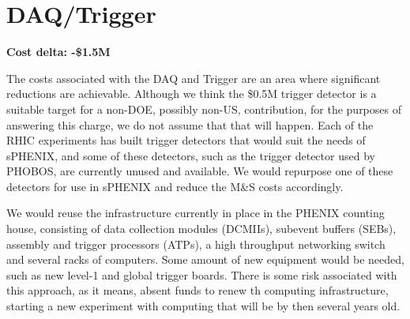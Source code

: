\section{DAQ/Trigger}
\label{daq}

\textbf{Cost delta: -\$1.5M}

The costs associated with the DAQ and Trigger are an area where
significant reductions are achievable.  Although we think the
\$0.5M trigger detector is a suitable target for a non-DOE, possibly
non-US, contribution, for the purposes of answering this charge, we do
not assume that that will happen.  Each of the RHIC experiments has
built trigger detectors that would suit the needs of sPHENIX, and some
of these detectors, such as the trigger detector used by PHOBOS, are
currently unused and available.  We would repurpose one of these
detectors for use in sPHENIX and reduce the M\&S costs accordingly.

We would reuse the infrastructure currently in place in the PHENIX
counting house, consisting of data collection modules (DCMIIs),
subevent buffers (SEBs), assembly and trigger processors (ATPs), a
high throughput networking switch and several racks of computers.
Some amount of new equipment would be needed, such as new level-1 and
global trigger boards.  There is some risk associated with this
approach, as it means, absent funds to renew th computing
infrastructure, starting a new experiment with computing that will be
by then several years old.



